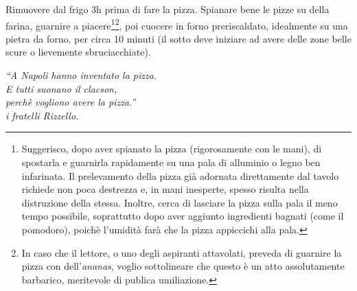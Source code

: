 Rimuovere dal frigo 3h prima di fare la pizza.
Spianare bene le pizze su della farina, guarnire a piacere\footnote{Suggerisco, dopo aver spianato la pizza (rigorosamente con le mani), di spostarla e guarnirla rapidamente su una pala di alluminio o legno ben infarinata. Il prelevamento della pizza già adornata direttamente dal tavolo richiede non poca destrezza e, in mani inesperte, spesso risulta nella distruzione della stessa. Inoltre, cerca di lasciare la pizza sulla pala il meno tempo possibile, soprattutto dopo aver aggiunto ingredienti bagnati (come il pomodoro), poichè l'umidità farà che la pizza appiccichi alla pala.}\footnote{In caso che il lettore, o uno degli aspiranti attavolati, preveda di guarnire la pizza con dell'\textit{ananas}, voglio sottolineare che questo è un atto assolutamente barbarico, meritevole di publica umiliazione.}, poi cuocere in forno preriscaldato, idealmente su una pietra da forno, per circa 10 minuti (il sotto deve iniziare ad avere delle zone belle scure o lievemente sbruciacchiate). 

\begin{recipeblock}
\noindent \textit{``A Napoli hanno inventato la pizza. \\ 
E tutti suonano il clacson, \\ perchè vogliono avere la pizza.'' \\ \normalfont \hspace{1.5cm} \textemdash i fratelli Rizzello.}
\end{recipeblock}
\vfill
